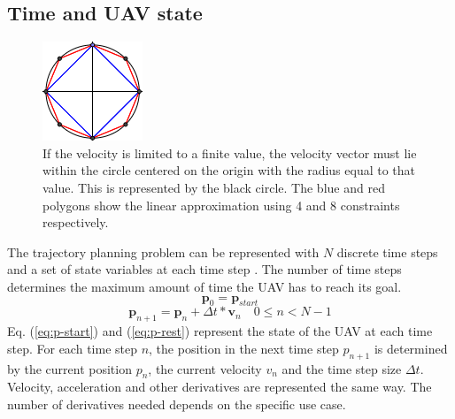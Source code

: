 \subsection{Time and UAV state}
\label{section:modeling}
\begin{figure}
    \centering
        \includegraphics[width=0.33\columnwidth]{img/circlelinear2}
    \caption{If the velocity is limited to a finite value, the velocity vector must lie within the circle centered on the origin with the radius equal to that value. This is represented by the black circle. The blue and red polygons show the linear approximation using 4 and 8 constraints respectively.}\label{fig:circlelinear}
\end{figure}
The trajectory planning problem can be represented with $N$ discrete time steps and a set of state variables at each time step \cite{Bellingham2002}. The number of time steps determines the maximum amount of time the UAV has to reach its goal. 
\begin{equation}
\label{eq:p-start}
\boldsymbol{p}_0 = \boldsymbol{p}_{start}
\end{equation}
\begin{equation}
\label{eq:p-rest}
\boldsymbol{p}_{n+1} = \boldsymbol{p}_{n} + \Delta t * \boldsymbol{v}_{n}  \quad 0 \leq n < N - 1
\end{equation}
Eq. (\ref{eq:p-start}) and (\ref{eq:p-rest}) represent the state of the UAV at each time step. For each time step $n$, the position in the next time step $p_{n+1}$ is determined by the current position $p_n$, the current velocity $v_n$ and the time step size $\Delta t$. Velocity, acceleration and other derivatives are represented the same way. The number of derivatives needed depends on the specific use case.
